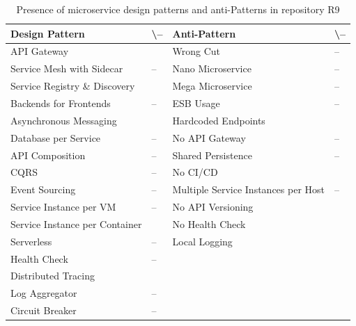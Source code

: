 \documentclass{Configuration_Files/PoliMi3i_thesis}
\newcommand{\cmark}{\ding{51}}%
\begin{document}
\begin{table}[H]
\centering 
    \begin{tabular}{ 
  | >{\centering\arraybackslash} m{16em} 
  | >{\centering\arraybackslash} m{2.2em} 
  | >{\centering\arraybackslash} m{16em} 
  | >{\centering\arraybackslash} m{2.2em} | }
    \hline
    \rowcolor{bluepoli!40}
    \textbf{Design Pattern} & \cmark \textbackslash – & \textbf{Anti-Pattern} & \cmark \textbackslash – \T\B \\
    \hline \hline
    API Gateway & \cmark & Wrong Cut & – \T\B\\
    \hline
    \rowcolor{bluepoli!10}
    Service Mesh with Sidecar & – & Nano Microservice & – \T\B \\
    \hline
    Service Registry \& Discovery & \cmark & Mega Microservice & – \T\B \\
    \hline
    \rowcolor{bluepoli!10}
    Backends for Frontends & – & ESB Usage & – \T\B \\
    \hline
    Asynchronous Messaging & \cmark & Hardcoded Endpoints & \cmark \T\B \\
    \hline
    \rowcolor{bluepoli!10}
    Database per Service & – & No API Gateway & – \T\B \\
    \hline
    API Composition & – & Shared Persistence & – \T\B \\
    \hline
    \rowcolor{bluepoli!10}
    CQRS & – & No CI/CD & \cmark \T\B \\
    \hline
    Event Sourcing & – & Multiple Service Instances per Host & – \T\B \\
    \hline
    \rowcolor{bluepoli!10}
    Service Instance per VM & – & No API Versioning & \cmark \T\B \\
    \hline
    Service Instance per Container & \cmark & No Health Check & \cmark \T\B \\
    \hline
    \rowcolor{bluepoli!10}
    Serverless & – & Local Logging & \cmark \T\B \\
    \hline
    Health Check & – &  & \T\B \\
    \hline
    \rowcolor{bluepoli!10}
    Distributed Tracing & \cmark & & \T\B \\
    \hline
    Log Aggregator & – &  & \T\B \\
    \hline
    \rowcolor{bluepoli!10}
    Circuit Breaker & – &  & \T\B \\
    \hline
    \end{tabular}
    \\[10pt]
    \caption{Presence of microservice design patterns and anti-Patterns in repository R9}
    \label{table:R9_result}
\end{table}
\end{document}
